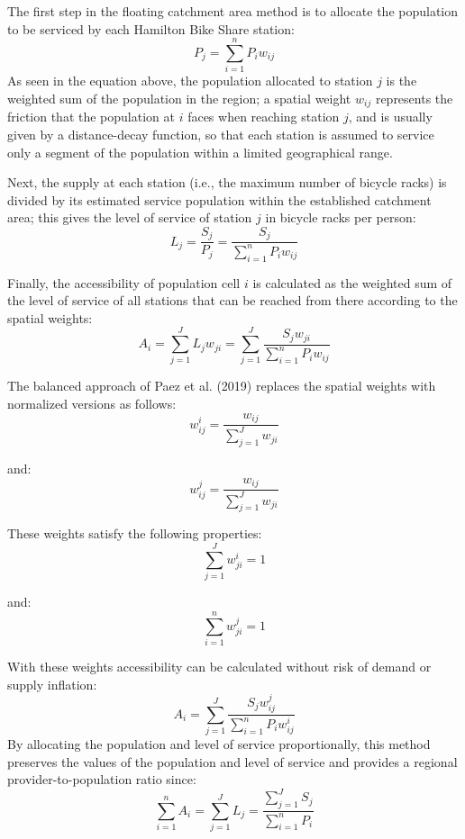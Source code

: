 \documentclass[]{elsarticle} %
\begin{document}
The first step in the floating catchment area method is to allocate the
population to be serviced by each Hamilton Bike Share station: \[
P_j = {\sum_{i = 1}^{n} P_i{w_{ij}}}
\] As seen in the equation above, the population allocated to station
\(j\) is the weighted sum of the population in the region; a spatial
weight \(w_{ij}\) represents the friction that the population at \(i\)
faces when reaching station \(j\), and is usually given by a
distance-decay function, so that each station is assumed to service only
a segment of the population within a limited geographical range.

Next, the supply at each station (i.e., the maximum number of bicycle
racks) is divided by its estimated service population within the
established catchment area; this gives the level of service of station
\(j\) in bicycle racks per person: \[
L_j = \frac {S_j}{P_j} = \frac {S_j}{{\sum_{i = 1}^{n} P_i{w_{ij}}}}
\]

Finally, the accessibility of population cell \(i\) is calculated as the
weighted sum of the level of service of all stations that can be reached
from there according to the spatial weights: \[
A_i = {\sum_{j = 1}^{J} L_j{w_{ji}}} = {\sum_{j = 1}^{J} \frac {S_j{w_{ji}}}{\sum_{i = 1}^{n} P_i{w_{ij}}}}
\]

The balanced approach of Paez et al. (2019) replaces the spatial weights
with normalized versions as follows: \[
{w_{ij}^{i} = \frac {w_{ij}}{\sum_{j = 1}^{J} {w_{ji}}}}
\]

\noindent and: \[
{w_{ij}^{j} = \frac {w_{ij}}{\sum_{j = 1}^{J} {w_{ji}}}}
\]

These weights satisfy the following properties: \[
\sum_{j = 1}^{J} {w^i_{ji}} = 1
\]

\noindent and: \[
\sum_{i = 1}^{n} {w^j_{ji}} = 1
\]

With these weights accessibility can be calculated without risk of
demand or supply inflation: \[
A_i = {\sum_{j = 1}^{J} \frac {S_j{w^j_{ij}}}{\sum_{i = 1}^{n} P_i{w^i_{ij}}}}
\] By allocating the population and level of service proportionally,
this method preserves the values of the population and level of service
and provides a regional provider-to-population ratio since: \[
\sum_{i=1}^n A_i = \sum_{j=1}^J L_j = \frac{\sum_{j=1}^JS_j}{\sum_{i=1}^n P_i}
\]
\end{document}
